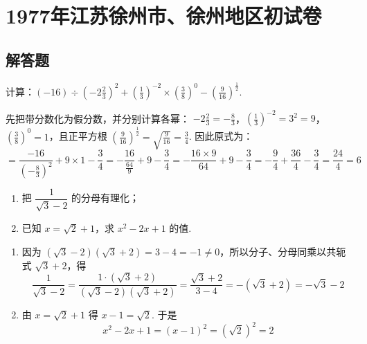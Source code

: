 \chapter{1977年江苏徐州市、徐州地区初试卷}

\section{解答题}

\begin{problem}
计算：\( (-16)\div\left(-2\frac{2}{3}\right)^2+\left(\frac{1}{3}\right)^{-2}\times\left(\frac{3}{8}\right)^0-\left(\frac{9}{16}\right)^{\frac{1}{2}} \).
\end{problem}

\begin{solution}
先把带分数化为假分数，并分别计算各幂：
\(-2\frac{2}{3}=-\frac{8}{3}\)，\(\left(\frac{1}{3}\right)^{-2}=3^2=9\)，\(\left(\frac{3}{8}\right)^0=1\)，且正平方根 \(\left(\frac{9}{16}\right)^{\frac{1}{2}}=\sqrt{\frac{9}{16}}=\frac{3}{4}\). 因此原式为：
\[
=\frac{-16}{\left(-\frac{8}{3}\right)^2}+9\times1-\frac{3}{4}
=-\frac{16}{\frac{64}{9}}+9-\frac{3}{4}
=-\frac{16\times9}{64}+9-\frac{3}{4}
=-\frac{9}{4}+\frac{36}{4}-\frac{3}{4}=\frac{24}{4}=6
\]
\end{solution}

\begin{problem}
\begin{enumerate}
\item 把 \(\dfrac{1}{\sqrt{3}-2}\) 的分母有理化；
\item 已知 \(x=\sqrt{2}+1\)，求 \(x^2-2x+1\) 的值.
\end{enumerate}
\end{problem}

\begin{solution}
\begin{enumerate}
\item 因为 \(\left(\sqrt{3}-2\right)\left(\sqrt{3}+2\right)=3-4=-1\ne0\)，所以分子、分母同乘以共轭式 \(\sqrt{3}+2\)，得
\[
\frac{1}{\sqrt{3}-2}=\frac{1\cdot\left(\sqrt{3}+2\right)}{\left(\sqrt{3}-2\right)\left(\sqrt{3}+2\right)}=\frac{\sqrt{3}+2}{3-4}
=-\left(\sqrt{3}+2\right)=-\sqrt{3}-2
\]

\item 由 \(x=\sqrt{2}+1\) 得 \(x-1=\sqrt{2}\). 于是
\[
x^2-2x+1=\left(x-1\right)^2=\left(\sqrt{2}\right)^2=2
\]
\end{enumerate}
\end{solution}

